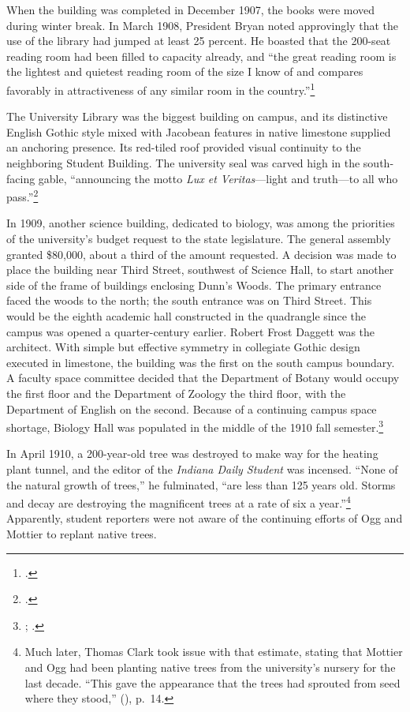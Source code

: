 \documentclass[
  american,
  letterpaper,
]{scrreprt}
\begin{document}
When the building was completed in December 1907, the books were moved
during winter break. In March 1908, President Bryan noted approvingly
that the use of the library had jumped at least 25 percent. He boasted
that the 200-seat reading room had been filled to capacity already, and
``the great reading room is the lightest and quietest reading room of
the size I know of and compares favorably in attractiveness of any
similar room in the country.''\footnote{.}

The University Library was the biggest building on campus, and its
distinctive English Gothic style mixed with Jacobean features in native
limestone supplied an anchoring presence. Its red-tiled roof provided
visual continuity to the neighboring Student Building. The university
seal was carved high in the south-facing gable, ``announcing the motto
\emph{Lux et Veritas}---light and truth---to all who pass.''\footnote{.}

In 1909, another science building, dedicated to biology, was among the
priorities of the university's budget request to the state legislature.
The general assembly granted \$80,000, about a third of the amount
requested. A decision was made to place the building near Third Street,
southwest of Science Hall, to start another side of the frame of
buildings enclosing Dunn's Woods. The primary entrance faced the woods
to the north; the south entrance was on Third Street. This would be the
eighth academic hall constructed in the quadrangle since the campus was
opened a quarter-century earlier. Robert Frost Daggett was the
architect. With simple but effective symmetry in collegiate Gothic
design executed in limestone, the building was the first on the south
campus boundary. A faculty space committee decided that the Department
of Botany would occupy the first floor and the Department of Zoology the
third floor, with the Department of English on the second. Because of a
continuing campus space shortage, Biology Hall was populated in the
middle of the 1910 fall semester.\footnote{;
  .}

In April 1910, a 200-year-old tree was destroyed to make way for the
heating plant tunnel, and the editor of the \emph{Indiana Daily Student}
was incensed. ``None of the natural growth of trees,'' he fulminated,
``are less than 125 years old. Storms and decay are destroying the
magnificent trees at a rate of six a year.''\footnote{Much later, Thomas
  Clark took issue with that estimate, stating that Mottier and Ogg had
  been planting native trees from the university's nursery for the last
  decade. ``This gave the appearance that the trees had sprouted from
  seed where they stood,'' (), p.~14.} Apparently, student reporters were not
aware of the continuing efforts of Ogg and Mottier to replant native
trees.
\end{document}
